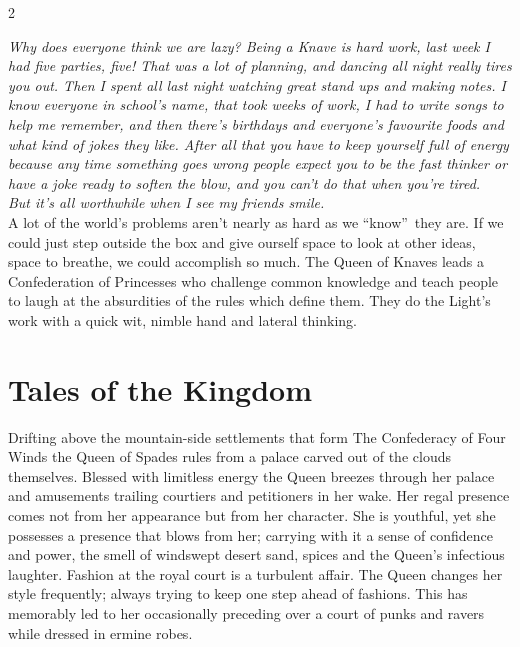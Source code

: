 \label{scha:Spades}\begin{multicols}{2}\raggedcolumns

\noindent \textit{Why does everyone think we are lazy? Being a Knave is hard work, last week I had five parties, five! That was a lot of planning, and dancing all night really tires you out. Then I spent all last night watching great stand ups and making notes. I know everyone in school's name, that took weeks of work, I had to write songs to help me remember, and then there's birthdays and everyone's favourite foods and what kind of jokes they like. After all that you have to keep yourself full of energy because any time something goes wrong people expect you to be the fast thinker or have a joke ready to soften the blow, and you can't do that when you're tired. }\\

\noindent \textit{But it's all worthwhile when I see my friends smile.}\\

\noindent A lot of the world's problems aren't nearly as hard as we \textquotedblleft know\textquotedblright\, they are. If we could just step outside the box and give ourself space to look at other ideas, space to breathe, we could accomplish so much. The Queen of Knaves leads a Confederation of Princesses who challenge common knowledge and teach people to laugh at the absurdities of the rules which define them. They do the Light's work with a quick wit, nimble hand and lateral thinking. 

\section*{Tales of the Kingdom}

Drifting above the mountain-side settlements that form The Confederacy of Four Winds the Queen of Spades rules from a palace carved out of the clouds themselves. Blessed with limitless energy the Queen breezes through her palace and amusements trailing courtiers and petitioners in her wake. Her regal presence comes not from her appearance but from her character. She is youthful, yet she possesses a presence that blows from her; carrying with it a sense of confidence and power, the smell of windswept desert sand, spices and the Queen's infectious laughter. Fashion at the royal court is a turbulent affair. The Queen changes her style frequently; always trying to keep one step ahead of fashions. This has memorably led to her occasionally preceding over a court of punks and ravers while dressed in ermine robes.


\end{multicols}
